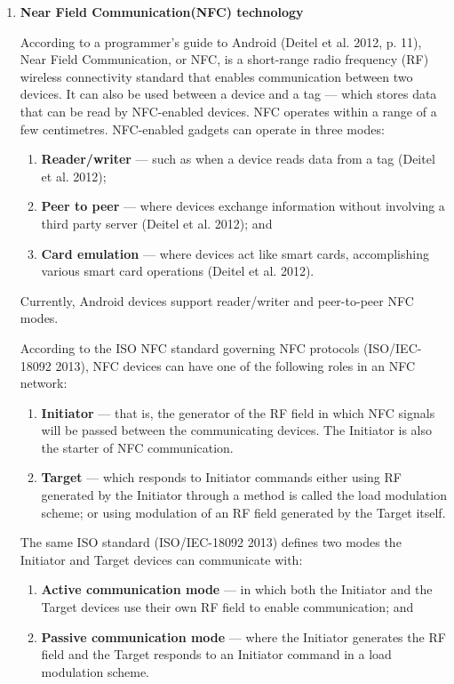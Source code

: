 \documentclass[12pt,svgnames,smaller]{article} %
\begin{document}
	\begin{enumerate}
		\item \textbf{ Near Field Communication(NFC) technology }
		
		According to a programmer’s guide to Android (Deitel et al. 2012, p. 11), Near Field Communication, or NFC, is a short-range radio frequency (RF) wireless connectivity standard that enables communication between two devices. It can also be used between a device and a tag --– which stores data that can be read by NFC-enabled devices. NFC operates within a range of a few centimetres. NFC-enabled gadgets can operate in three modes:
		
		\begin{enumerate}
			\item \textbf{Reader/writer} --– such as when a device reads data from a tag (Deitel et al. 2012);
			\item \textbf{Peer to peer} --- where devices exchange information without involving a third party server (Deitel et al. 2012); and
			\item \textbf{Card emulation} --– where devices act like smart cards, accomplishing various smart card operations (Deitel et al. 2012).
		\end{enumerate}
		
		Currently, Android devices support reader/writer and peer-to-peer NFC modes.
		
		According to the ISO NFC standard governing NFC protocols (ISO/IEC-18092 2013), NFC devices can have one of the following roles in an NFC network:
		
		\begin{enumerate}
			\item \textbf{Initiator} --– that is, the generator of the RF field in which NFC signals will be passed between the communicating devices. The Initiator is also the starter of NFC communication.
			\item \textbf{Target} --- which responds to Initiator commands either using RF generated by the Initiator through a method is called the load modulation scheme; or using modulation of an RF field generated by the Target itself. 
		\end{enumerate}
		
		The same ISO standard (ISO/IEC-18092 2013) defines two modes the Initiator and Target devices can communicate with:
		
		\begin{enumerate}
			\item \textbf{Active communication mode} --– in which both the Initiator and the Target devices use their own RF field to enable communication; and
			\item \textbf{Passive communication mode} –-- where the Initiator generates the RF field and the Target responds to an Initiator command in a load modulation scheme.
		\end{enumerate}
		

\end{enumerate}
\end{document}
